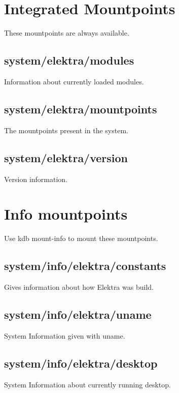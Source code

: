 \hypertarget{md_doc_help_elektra-hierarchy_doc_help_elektra-hierarchy_md}{}\section{Integrated Mountpoints}\label{md_doc_help_elektra-hierarchy_doc_help_elektra-hierarchy_md}
These mountpoints are always available.

\subsection*{system/elektra/modules}

Information about currently loaded modules.

\subsection*{system/elektra/mountpoints}

The mountpoints present in the system.

\subsection*{system/elektra/version}

Version information.

\section*{Info mountpoints}

Use {\ttfamily kdb mount-\/info} to mount these mountpoints.

\subsection*{system/info/elektra/constants}

Gives information about how Elektra was build.

\subsection*{system/info/elektra/uname}

System Information given with {\ttfamily uname}.

\subsection*{system/info/elektra/desktop}

System Information about currently running desktop.

